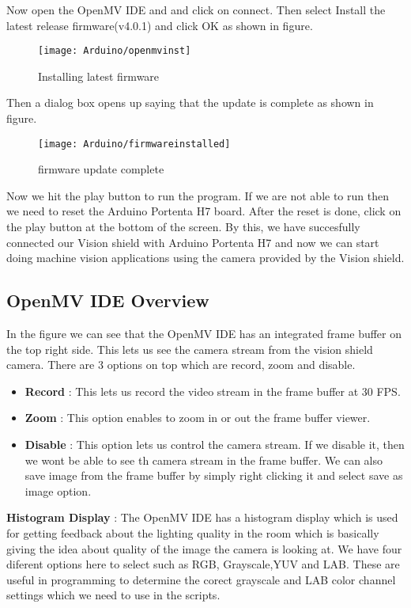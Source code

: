 Now open the OpenMV IDE and and click on connect. Then select Install the latest release firmware(v4.0.1) and click OK as shown in figure. 
\begin{figure}[H]
	\centering
	\texttt{[image: Arduino/openmvinst]}
	\caption{Installing latest firmware}
	\label{figure 6.8}
\end{figure}

Then a dialog box opens up saying that the update is complete as shown in figure. 

\begin{figure}[H]
	\centering
	\texttt{[image: Arduino/firmwareinstalled]}
	\caption{firmware update complete}
	\label{figure 6.9}
\end{figure}
Now  we hit the play button to run the program. If we are not able to run then we need to reset the Arduino Portenta H7 board. After the reset is done, click on the play button at the bottom of the screen. By this, we have succesfully connected our Vision shield with Arduino Portenta H7 and now we can start doing machine vision applications using the camera provided by the Vision shield.
\subsection{OpenMV IDE Overview}
In the figure  we can see that the OpenMV IDE has an integrated frame buffer on the top right side. This lets us see the camera stream from the vision shield camera. There are 3 options on top which are record, zoom and disable.
\begin{itemize}
	\item  \textbf{Record} : This lets us record the video stream in the frame buffer at 30 FPS.
	\item \textbf{Zoom} : This option enables to zoom in or out the frame buffer viewer.
	\item \textbf{Disable} : This option lets us control the camera stream. If we disable it, then we wont be able to see th camera stream in the frame buffer. We can also save image from the frame buffer by simply right clicking it and select save as image option.
	
\end{itemize}
\textbf{Histogram Display} :
The OpenMV IDE has a histogram display which is used for getting feedback about the lighting quality in the room which is basically giving the idea about quality of the image the camera is looking at. We have four diferent options here to select such as RGB, Grayscale,YUV and LAB. These are useful in programming to determine the corect grayscale and LAB color channel settings which we need to use in the scripts.

